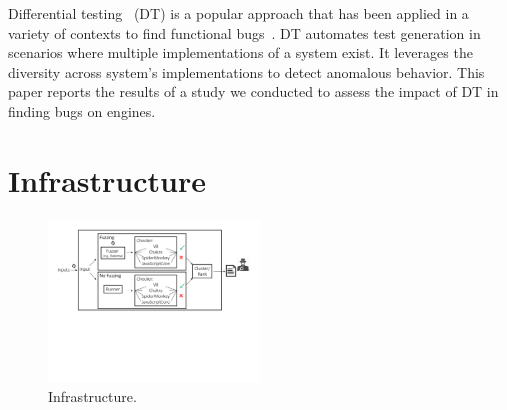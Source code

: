 \documentclass[10pt,conference,anonymous]{IEEEtran}
\begin{document}
Differential testing~\cite{Brumley-etal-ss07} (DT) is a popular
approach that has been applied in a variety of contexts to find
functional
bugs~\cite{Yang-etal-pldi11,Chen-etal-fse2015,Argyros-etla-ccs16,Chen-etal-pldi16,petsios-etal-sp2017,SivakornAPKJ17}. DT
automates test generation in scenarios where multiple implementations
of a system exist. It leverages the diversity across system's
implementations to detect anomalous behavior. This paper reports the
results of a study we conducted to assess the impact of DT in finding
bugs on \js{} engines.


 

\section{Infrastructure}
\label{sec:design}


\begin{figure}[t]
  \centering
  \includegraphics[trim=0 250 0 0,clip,width=0.5\textwidth]{google-awards-workflow}  
  \caption{\label{fig:workflow}Infrastructure.}
\end{figure}
\end{document}
